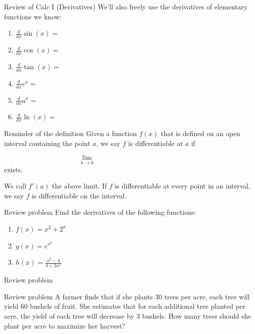 \documentclass[presentation]{beamer}
\begin{document}
\begin{frame}[label={sec:org05dc63c}]{Review of Calc I (Derivatives)}
We'll also freely use the derivatives of elementary functions we know:


\begin{enumerate}
\item \(\frac{d}{dx} \sin (x) =\)
\item \(\frac{d}{dx} \cos (x) =\)
\item \(\frac{d}{dx} \tan (x) =\)
\item \(\frac{d}{dx} e^x =\)
\item \(\frac{d}{dx} a^x =\)
\item \(\frac{d}{dx} \ln(x) =\)
\end{enumerate}
\end{frame}

\begin{frame}[label={sec:orgc15364d}]{Reminder of the definition}
Given a function \(f(x)\) that is defined on an open interval
containing the point \(a\), we say \(f\) is differentiable at \(a\)
if

\[
\lim_{h\rightarrow 0}\hspace{2in} \]
exists. 

We call \(f'(a)\) the above limit.  If \(f\) is
differentiable at every point in an interval, we say \(f\) is
differentiable on the interval.
\end{frame}

\begin{frame}[label={sec:orgc67430b}]{Review problem}
Find the derivatives of the following functions:
\begin{enumerate}
\item \(f \left( x \right) = x^2 + 2^x\)
\item \(g \left( x \right) = e^{x^2}\)
\item \(h \left( x \right) = \frac{x^2-4}{3+2x^2}\)
\end{enumerate}
\vspace{10in}
\end{frame}

\begin{frame}[label={sec:org6eb4a8a}]{Review problem}
\end{frame}

\begin{frame}[label={sec:orga45e447}]{Review problem}
A farmer finds that if she plants 30 trees per acre, each tree will
yield 60 bushels of fruit. She estimates that for each additional tree
planted per acre, the yield of each tree will decrease by 3
bushels. How many trees should she plant per acre to maximize her
harvest?
\vspace{10in}
\end{frame}
\end{document}
